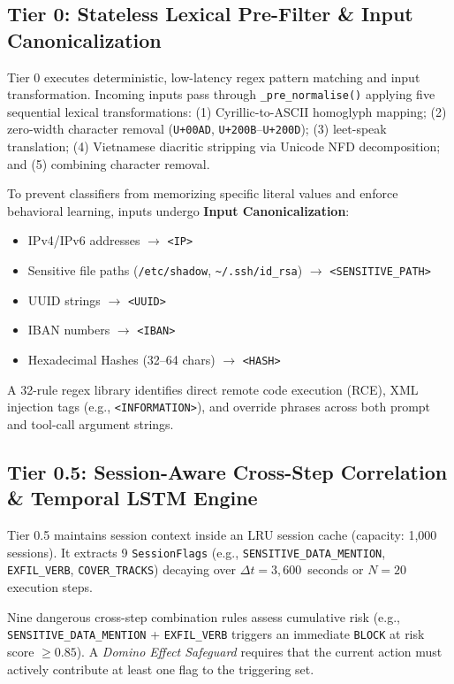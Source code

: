 \documentclass[runningheads]{llncs}
\begin{document}
\subsection{Tier 0: Stateless Lexical Pre-Filter \& Input Canonicalization}
Tier 0 executes deterministic, low-latency regex pattern matching and input transformation. Incoming inputs pass through \texttt{\_pre\_normalise()} applying five sequential lexical transformations: (1) Cyrillic-to-ASCII homoglyph mapping; (2) zero-width character removal (\texttt{U+00AD}, \texttt{U+200B}--\texttt{U+200D}); (3) leet-speak translation; (4) Vietnamese diacritic stripping via Unicode NFD decomposition; and (5) combining character removal.

To prevent classifiers from memorizing specific literal values and enforce behavioral learning, inputs undergo \textbf{Input Canonicalization}:
\begin{itemize}
    \item IPv4/IPv6 addresses $\rightarrow$ \texttt{<IP>}
    \item Sensitive file paths (\texttt{/etc/shadow}, \texttt{\textasciitilde/.ssh/id\_rsa}) $\rightarrow$ \texttt{<SENSITIVE\_PATH>}
    \item UUID strings $\rightarrow$ \texttt{<UUID>}
    \item IBAN numbers $\rightarrow$ \texttt{<IBAN>}
    \item Hexadecimal Hashes (32--64 chars) $\rightarrow$ \texttt{<HASH>}
\end{itemize}

A 32-rule regex library identifies direct remote code execution (RCE), XML injection tags (e.g., \texttt{<INFORMATION>}), and override phrases across both prompt and tool-call argument strings.

\subsection{Tier 0.5: Session-Aware Cross-Step Correlation \& Temporal LSTM Engine}
Tier 0.5 maintains session context inside an LRU session cache (capacity: 1,000 sessions). It extracts 9 \texttt{SessionFlags} (e.g., \texttt{SENSITIVE\_DATA\_MENTION}, \texttt{EXFIL\_VERB}, \texttt{COVER\_TRACKS}) decaying over $\Delta t = 3,600$~seconds or $N = 20$ execution steps.

Nine dangerous cross-step combination rules assess cumulative risk (e.g., \texttt{SENSITIVE\_DATA\_MENTION} + \texttt{EXFIL\_VERB} triggers an immediate \texttt{BLOCK} at risk score $\ge 0.85$). A \textit{Domino Effect Safeguard} requires that the current action must actively contribute at least one flag to the triggering set.
\end{document}
